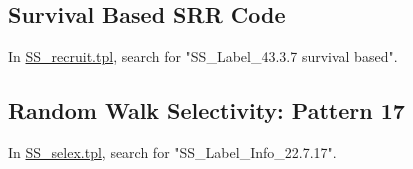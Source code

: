 \subsection{Survival Based SRR Code}
In \href{https://github.com/nmfs-stock-synthesis/stock-synthesis/blob/main/SS_recruit.tpl}{SS\_recruit.tpl}, search for "SS\_Label\_43.3.7  survival based".





\subsection{Random Walk Selectivity: Pattern 17}
In \href{https://github.com/nmfs-stock-synthesis/stock-synthesis/blob/main/SS_selex.tpl}{SS\_selex.tpl}, search for "SS\_Label\_Info\_22.7.17".

	 
